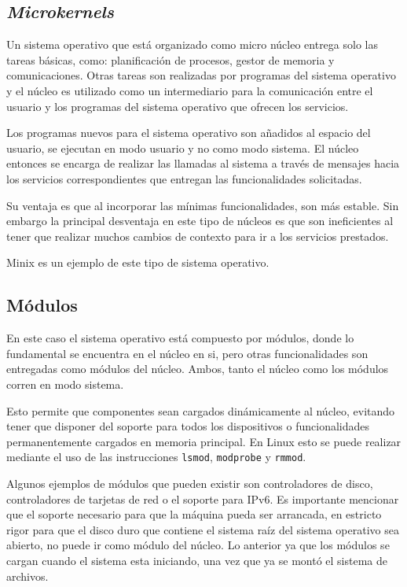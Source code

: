 \subsection{\textit{Microkernels}}
Un sistema operativo que está organizado como micro núcleo entrega solo las
tareas básicas, como: planificación de procesos, gestor de memoria y
comunicaciones. Otras tareas son realizadas por programas del sistema operativo
y el núcleo es utilizado como un intermediario para la comunicación entre el
usuario y los programas del sistema operativo que ofrecen los servicios.

Los programas nuevos para el sistema operativo son añadidos al espacio del
usuario, se ejecutan en modo usuario y no como modo sistema. El núcleo entonces
se encarga de realizar las llamadas al sistema a través de mensajes hacia los
servicios correspondientes que entregan las funcionalidades solicitadas.

Su ventaja es que al incorporar las mínimas funcionalidades, son más estable.
Sin embargo la principal desventaja en este tipo de núcleos es que son
ineficientes al tener que realizar muchos cambios de contexto para ir a los
servicios prestados.

Minix es un ejemplo de este tipo de sistema operativo.

\subsection{Módulos}
En este caso el sistema operativo está compuesto por módulos, donde lo
fundamental se encuentra en el núcleo en si, pero otras funcionalidades son
entregadas como módulos del núcleo. Ambos, tanto el núcleo como los módulos
corren en modo sistema.

Esto permite que componentes sean cargados dinámicamente al núcleo, evitando
tener que disponer del soporte para todos los dispositivos o funcionalidades
permanentemente cargados en memoria principal. En Linux esto se puede realizar
mediante el uso de las instrucciones \texttt{lsmod}, \texttt{modprobe} y
\texttt{rmmod}.

Algunos ejemplos de módulos que pueden existir son controladores de disco,
controladores de tarjetas de red o el soporte para IPv6. Es importante mencionar
que el soporte necesario para que la máquina pueda ser arrancada, en estricto
rigor para que el disco duro que contiene el sistema raíz del sistema operativo
sea abierto, no puede ir como módulo del núcleo. Lo anterior ya que los módulos
se cargan cuando el sistema esta iniciando, una vez que ya se montó el sistema
de archivos.

